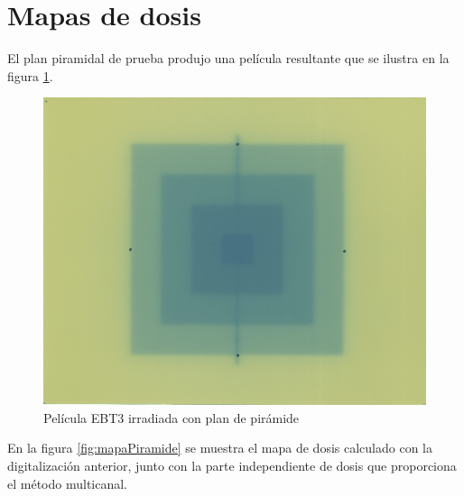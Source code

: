 \section{Mapas de dosis}


El plan piramidal de prueba produjo una película resultante que se ilustra en la figura \ref{fig:piramideEscaneada}.\\
\begin{figure}[H]
	\centering
	\includegraphics[width=0.7\linewidth]{images/peliculaPiramide.png}
	\caption{Película EBT3 irradiada con plan de pirámide }
	\label{fig:piramideEscaneada}
\end{figure}

En la figura \ref{fig:mapaPiramide} se muestra el mapa de dosis calculado con la digitalización anterior, junto con la parte independiente de dosis que proporciona el método multicanal.\\

